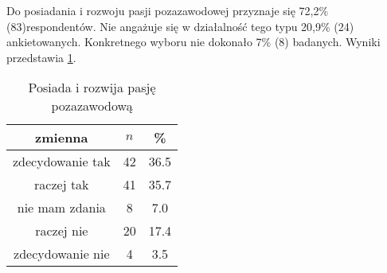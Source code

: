 
Do posiadania i rozwoju pasji pozazawodowej przyznaje się 72,2\% (83)respondentów. Nie angażuje się w działalność tego typu 20,9\% (24) ankietowanych. Konkretnego wyboru nie dokonało 7\% (8) badanych. Wyniki przedstawia \ref{tab:Q23}.




\begin{table}[H]
\caption{Posiada i rozwija pasję pozazawodową}
\centering
\begin{tabular}{ | c | c | c |}
\hline
zmienna & $n$ & \% \\
\hline
zdecydowanie tak  &  42  & 36.5\\
\hline
raczej tak  &  41  & 35.7\\
\hline
nie mam zdania  &  8  & 7.0 \\
\hline
raczej nie  &  20  & 17.4 \\
\hline
zdecydowanie nie  &  4  & 3.5\\
\hline
\end{tabular}
\label{tab:Q23}
\end{table}
